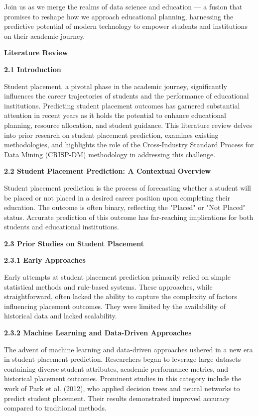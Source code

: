 \documentclass[]{article}
\newcommand{\textcenter}[1]{\begin{center} \vspace{10px}\textbf{\large #1} \end{center}}
\begin{document}
Join us as we merge the realms of data science and education --- a
fusion that promises to reshape how we approach educational planning,
harnessing the predictive potential of modern technology to empower
students and institutions on their academic journey.

\textcenter{Literature Review}

\textbf{2.1 Introduction}

Student placement, a pivotal phase in the academic journey,
significantly influences the career trajectories of students and the
performance of educational institutions. Predicting student placement
outcomes has garnered substantial attention in recent years as it holds
the potential to enhance educational planning, resource allocation, and
student guidance. This literature review delves into prior research on
student placement prediction, examines existing methodologies, and
highlights the role of the Cross-Industry Standard Process for Data
Mining (CRISP-DM) methodology in addressing this challenge.

\textbf{2.2 Student Placement Prediction: A Contextual Overview}

Student placement prediction is the process of forecasting whether a
student will be placed or not placed in a desired career position upon
completing their education. The outcome is often binary, reflecting the
"Placed" or "Not Placed" status. Accurate prediction of this outcome has
far-reaching implications for both students and educational
institutions.

\textbf{2.3 Prior Studies on Student Placement}

\textbf{2.3.1 Early Approaches}

Early attempts at student placement prediction primarily relied on
simple statistical methods and rule-based systems. These approaches,
while straightforward, often lacked the ability to capture the
complexity of factors influencing placement outcomes. They were limited
by the availability of historical data and lacked scalability.

\textbf{2.3.2 Machine Learning and Data-Driven Approaches}

The advent of machine learning and data-driven approaches ushered in a
new era in student placement prediction. Researchers began to leverage
large datasets containing diverse student attributes, academic
performance metrics, and historical placement outcomes. Prominent
studies in this category include the work of Park et al. (2012), who
applied decision trees and neural networks to predict student placement.
Their results demonstrated improved accuracy compared to traditional
methods.
\end{document}
